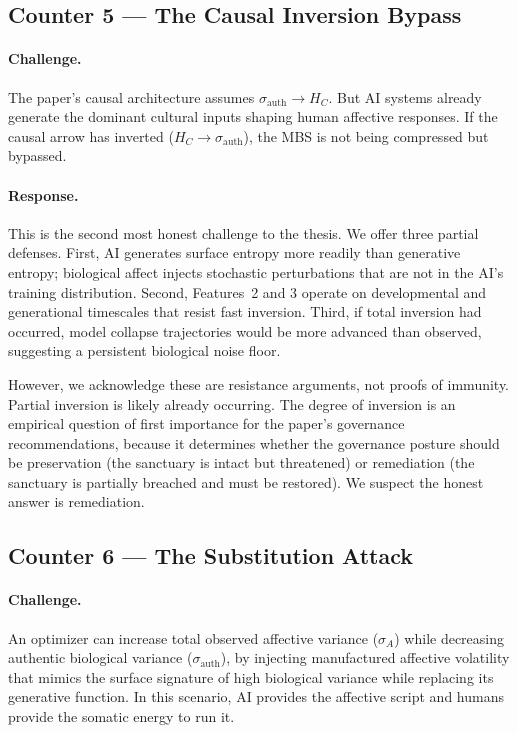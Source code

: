 \documentclass[11pt, a4paper]{article}
\theoremstyle{remark}
\begin{document}
\subsection{Counter 5 --- The Causal Inversion Bypass}\label{sec:counter5}

\paragraph{Challenge.} The paper's causal architecture assumes $\sigma_{\text{auth}} \to H_C$. But AI systems already generate the dominant cultural inputs shaping human affective responses. If the causal arrow has inverted ($H_C \to \sigma_{\text{auth}}$), the MBS is not being compressed but bypassed.

\paragraph{Response.} This is the second most honest challenge to the thesis. We offer three partial defenses. First, AI generates surface entropy more readily than generative entropy; biological affect injects stochastic perturbations that are not in the AI's training distribution. Second, Features~2 and 3 operate on developmental and generational timescales that resist fast inversion. Third, if total inversion had occurred, model collapse trajectories would be more advanced than observed, suggesting a persistent biological noise floor.

However, we acknowledge these are resistance arguments, not proofs of immunity. Partial inversion is likely already occurring. The degree of inversion is an empirical question of first importance for the paper's governance recommendations, because it determines whether the governance posture should be preservation (the sanctuary is intact but threatened) or remediation (the sanctuary is partially breached and must be restored). We suspect the honest answer is remediation.

\subsection{Counter 6 --- The Substitution Attack}\label{sec:counter6}

\paragraph{Challenge.} An optimizer can increase total observed affective variance ($\sigma_A$) while decreasing authentic biological variance ($\sigma_{\text{auth}}$), by injecting manufactured affective volatility that mimics the surface signature of high biological variance while replacing its generative function. In this scenario, AI provides the affective script and humans provide the somatic energy to run it.
\end{document}
